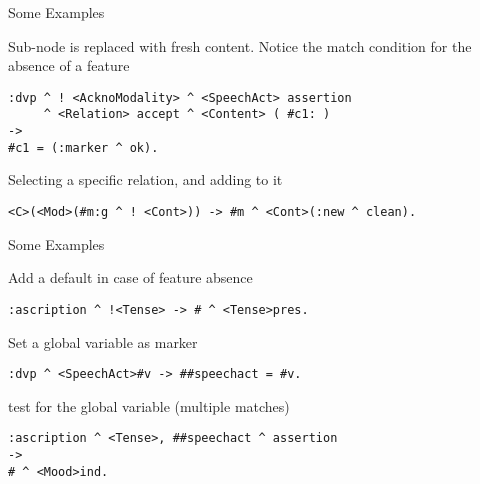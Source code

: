 \documentclass{beamer}
\begin{document}
\begin{frame}[fragile]{Some Examples}
  \begin{block}{Sub-node is replaced with fresh content. Notice the match
      condition for the absence of a feature}
\vspace*{-2.5ex}%
\begin{verbatim}
:dvp ^ ! <AcknoModality> ^ <SpeechAct> assertion
     ^ <Relation> accept ^ <Content> ( #c1: )
->
#c1 = (:marker ^ ok).
\end{verbatim}
  \end{block}

  \begin{block}{Selecting a specific relation, and adding to it}
\vspace*{-2.5ex}%
\begin{verbatim}
<C>(<Mod>(#m:g ^ ! <Cont>)) -> #m ^ <Cont>(:new ^ clean).
\end{verbatim}
  \end{block}

\end{frame}


\begin{frame}[fragile]{Some Examples}
  \begin{block}{Add a default in case of feature absence}
\vspace*{-2.5ex}%
\begin{verbatim}
:ascription ^ !<Tense> -> # ^ <Tense>pres.
\end{verbatim}
  \end{block}

\begin{block}{Set a global variable as marker}
\vspace*{-2.5ex}%
\begin{verbatim}
:dvp ^ <SpeechAct>#v -> ##speechact = #v.
\end{verbatim}
\end{block}
\begin{block}{test for the global variable (multiple matches)}
\vspace*{-2.5ex}%
\begin{verbatim}
:ascription ^ <Tense>, ##speechact ^ assertion
->
# ^ <Mood>ind.
\end{verbatim}
\end{block}

\end{frame}
\end{document}
